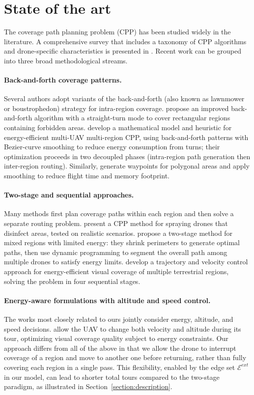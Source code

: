 \documentclass[12pt]{elsarticle}
\begin{document}
\section{State of the art}
The coverage path planning problem (CPP) has been studied widely in the literature. A comprehensive survey that includes a taxonomy of CPP algorithms and drone-specific characteristics is presented in \cite{Sonawane2023}. Recent work can be grouped into three broad methodological streams.

\paragraph{Back-and-forth coverage patterns.}
Several authors adopt variants of the back-and-forth (also known as lawnmower or boustrophedon) strategy for intra-region coverage. \cite{Mu2023} propose an improved back-and-forth algorithm with a straight-turn mode to cover rectangular regions containing forbidden areas. \cite{Ahmed2024} develop a mathematical model and heuristic for energy-efficient multi-UAV multi-region CPP, using back-and-forth patterns with Bezier-curve smoothing to reduce energy consumption from turns; their optimization proceeds in two decoupled phases (intra-region path generation then inter-region routing). Similarly, \cite{Tripipicchio2023} generate waypoints for polygonal areas and apply smoothing to reduce flight time and memory footprint.

\paragraph{Two-stage and sequential approaches.}
Many methods first plan coverage paths within each region and then solve a separate routing problem. \cite{art:VAZQUEZ} present a CPP method for spraying drones that disinfect areas, tested on realistic scenarios. \cite{art:Wang2024} propose a two-stage method for mixed regions with limited energy: they shrink perimeters to generate optimal paths, then use dynamic programming to segment the overall path among multiple drones to satisfy energy limits. \cite{Li2025} develop a trajectory and velocity control approach for energy-efficient visual coverage of multiple terrestrial regions, solving the problem in four sequential stages.

\paragraph{Energy-aware formulations with altitude and speed control.}
The works most closely related to ours jointly consider energy, altitude, and speed decisions. \cite{Li2025} allow the UAV to change both velocity and altitude during its tour, optimizing visual coverage quality subject to energy constraints. Our approach differs from all of the above in that we allow the drone to interrupt coverage of a region and move to another one before returning, rather than fully covering each region in a single pass. This flexibility, enabled by the edge set $\mathcal E^{ext}$ in our model, can lead to shorter total tours compared to the two-stage paradigm, as illustrated in Section~\ref{section:description}.
\end{document}
